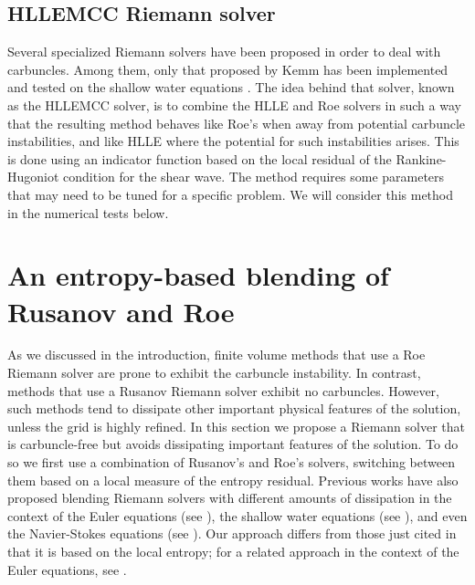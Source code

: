 \documentclass[preprint, 11pt]{article}
\begin{document}
\subsection{HLLEMCC Riemann solver} \label{sec:kemm}
Several specialized Riemann solvers have been proposed in order to deal
with carbuncles.  Among them, only that proposed by Kemm has been implemented
and tested on the shallow water equations \cite{kemm2014note,bader2014carbuncle}.
The idea behind that solver, known as the HLLEMCC solver, is to combine
the HLLE and Roe solvers in such a way that the resulting method behaves
like Roe's when away from potential carbuncle instabilities, and like HLLE
where the potential for such instabilities arises.   This is done using
an indicator function based on the local residual of the Rankine-Hugoniot
condition for the shear wave.  The method requires some parameters that
may need to be tuned for a specific problem.  We will consider this method
in the numerical tests below.


\section{An entropy-based blending of Rusanov and Roe}

As we discussed in the introduction, finite volume methods that use a
Roe Riemann solver are prone to exhibit the carbuncle instability.
In contrast, methods that use a Rusanov Riemann solver exhibit no carbuncles. 
However, such methods tend to dissipate other important physical features of
the solution, unless the grid is highly refined.
In this section we propose a Riemann solver
that is carbuncle-free but avoids dissipating important features of the solution.
To do so we first use a combination of Rusanov's and Roe's solvers, switching
between them based on a local measure of the entropy residual.
Previous works have also proposed blending Riemann solvers with different
amounts of dissipation in the context of the Euler equations (see
\cite{nishikawa2008very,wang2016developing,jaisankar2007diffusion,ohwada2018simple,deng2019new,ray2013entropy}),
the shallow water equations (see \cite{bader2014carbuncle,kemm2014note}),
and even the Navier-Stokes equations (see \cite{nishikawa2008very,ohwada2018simple}).
Our approach differs from those just cited in that it is based on the local entropy;
for a related approach in the context of the Euler equations, see
\cite{ismail2009affordable,ismail2009proposed}.
\end{document}
